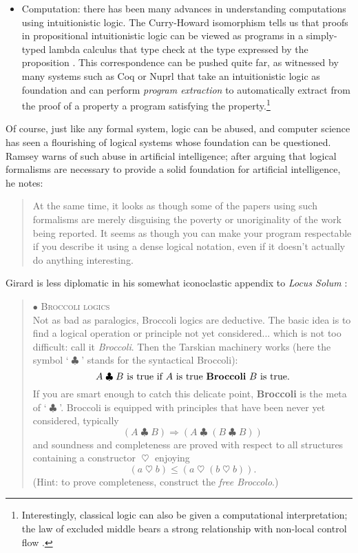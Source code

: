 \documentclass[11pt]{article}
\newcommand{\rimp}{\Rightarrow}
\newcommand{\<}{\langle}
\renewcommand{\>}{\rangle}
\begin{document}
\begin{itemize}
\item Computation: there has been many advances in understanding
  computations using intuitionistic logic.  The Curry-Howard
  isomorphism 
  tells us that proofs in propositional intuitionistic logic can be
  viewed as programs in a simply-typed lambda calculus that type check
  at the type expressed by the proposition \cite{r:girard88}. 
This correspondence can be pushed quite far, as witnessed by many
systems such as Coq \cite{r:coquand88} or Nuprl \cite{r:constable86}
that take an intuitionistic logic as foundation and can perform
\emph{program extraction} to automatically extract from the proof of a
property a program satisfying the property.\footnote{Interestingly,
classical logic can also be given a computational interpretation; the
law of excluded middle bears a strong relationship with non-local
control flow \cite{r:griffin90}.}
\end{itemize}


\newcommand{\brocc}{\ensuremath{\mathrel{\clubsuit}}}
\newcommand{\brocccons}{\ensuremath{\mathrel{\heartsuit}}}

Of course, just like any formal system, logic can be abused, and
computer science has seen a flourishing of logical systems whose
foundation can be questioned. 
Ramsey warns of such abuse in artificial intelligence; after arguing
that logical formalisms are necessary to provide a solid foundation
for artificial intelligence, he notes:
\begin{quote}
At the same time, it looks as though some of the papers using such
formalisms are merely disguising the poverty or unoriginality of the
work being reported. It seems as though you can make your program
respectable if you describe it using a dense logical notation, even
if it doesn't actually do anything interesting. \cite[p.vii]{r:ramsay88}
\end{quote}
Girard is less diplomatic in his somewhat iconoclastic appendix to
\emph{Locus Solum} \cite{r:girard01}: 
\begin{quote}
$\bullet$ \textsc{Broccoli logics}\\ 
Not as bad as paralogics, Broccoli logics are deductive. 
The basic idea is to find a logical operation or principle not yet
considered... which is not too difficult: call it \emph{Broccoli}. 
Then the Tarskian machinery works (here the symbol `\brocc'
stands for the syntactical Broccoli): 
\[\text{$A\brocc B$ is true if $A$ is true \textbf{Broccoli} $B$ is true.}\]
If you are smart enough to catch this delicate point, \textbf{Broccoli} is the meta of `\brocc'.
Broccoli is equipped with principles that have been never yet
considered, typically
\[(A \brocc B) \rimp (A \brocc (B \brocc B)) \]
and soundness and completeness are proved with respect to all
structures containing a constructor \brocccons{} enjoying 
\[ (a \brocccons b) \le (a \brocccons (b \brocccons
b)).\]
(Hint: to prove completeness, construct the \emph{free Broccolo}.) 
\cite[p.402]{r:girard01}
\end{quote}
\end{document}
